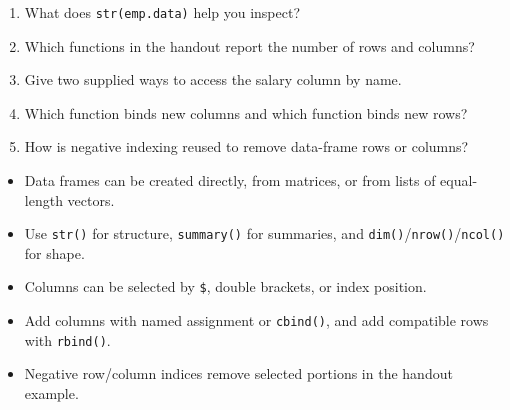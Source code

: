\begin{quickcheck}
\begin{enumerate}
  \item What does \texttt{str(emp.data)} help you inspect?
  \item Which functions in the handout report the number of rows and columns?
  \item Give two supplied ways to access the salary column by name.
  \item Which function binds new columns and which function binds new rows?
  \item How is negative indexing reused to remove data-frame rows or columns?
\end{enumerate}
\end{quickcheck}

\begin{chapterrecap}
\begin{itemize}
  \item Data frames can be created directly, from matrices, or from lists of equal-length vectors.
  \item Use \texttt{str()} for structure, \texttt{summary()} for summaries, and \texttt{dim()}/\texttt{nrow()}/\texttt{ncol()} for shape.
  \item Columns can be selected by \texttt{\$}, double brackets, or index position.
  \item Add columns with named assignment or \texttt{cbind()}, and add compatible rows with \texttt{rbind()}.
  \item Negative row/column indices remove selected portions in the handout example.
\end{itemize}
\end{chapterrecap}
